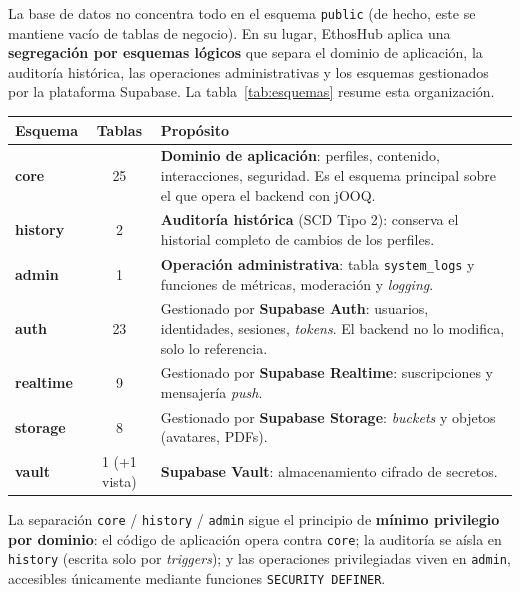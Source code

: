 La base de datos no concentra todo en el esquema \texttt{public} (de hecho, este se
mantiene vacío de tablas de negocio). En su lugar, EthosHub aplica una
\textbf{segregación por esquemas lógicos} que separa el dominio de aplicación, la
auditoría histórica, las operaciones administrativas y los esquemas gestionados por la
plataforma Supabase. La tabla~\ref{tab:esquemas} resume esta organización.

\vspace{0.2cm}
\noindent
\renewcommand{\arraystretch}{1.3}
\fontsize{8.5}{10.2}\selectfont\sffamily
\begin{tabularx}{\textwidth}{|>{\ttfamily\bfseries\color{colorPrimario}}l|c|X|}
\hline
\rowcolor{headerTabla}
\sffamily\textbf{Esquema} & \sffamily\textbf{Tablas} & \sffamily\textbf{Propósito} \\
\hline
core & 25 & \textbf{Dominio de aplicación}: perfiles, contenido, interacciones, seguridad. Es el esquema principal sobre el que opera el backend con jOOQ. \\
\hline
\rowcolor{grisTecnico}
history & 2 & \textbf{Auditoría histórica} (SCD Tipo 2): conserva el historial completo de cambios de los perfiles. \\
\hline
admin & 1 & \textbf{Operación administrativa}: tabla \texttt{system\_logs} y funciones de métricas, moderación y \textit{logging}. \\
\hline
\rowcolor{grisTecnico}
auth & 23 & Gestionado por \textbf{Supabase Auth}: usuarios, identidades, sesiones, \textit{tokens}. El backend no lo modifica, solo lo referencia. \\
\hline
realtime & 9 & Gestionado por \textbf{Supabase Realtime}: suscripciones y mensajería \textit{push}. \\
\hline
\rowcolor{grisTecnico}
storage & 8 & Gestionado por \textbf{Supabase Storage}: \textit{buckets} y objetos (avatares, PDFs). \\
\hline
vault & 1 (+1 vista) & \textbf{Supabase Vault}: almacenamiento cifrado de secretos. \\
\hline
\end{tabularx}
\label{tab:esquemas}

\begin{AvisoNota}
La separación \texttt{core} / \texttt{history} / \texttt{admin} sigue el principio de
\textbf{mínimo privilegio por dominio}: el código de aplicación opera contra
\texttt{core}; la auditoría se aísla en \texttt{history} (escrita solo por
\textit{triggers}); y las operaciones privilegiadas viven en \texttt{admin}, accesibles
únicamente mediante funciones \texttt{SECURITY DEFINER}.
\end{AvisoNota}

